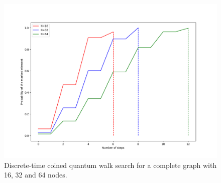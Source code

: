             	\begin{figure}[!h]
                    \centering
                    \includegraphics[scale=0.40]{img/CoinedQW/search/163264.png}
                     \caption{Discrete-time coined quantum walk search for a complete graph with 16, 32 and 64 nodes.}\label{fig:coinedSearch}
                \end{figure}
                
